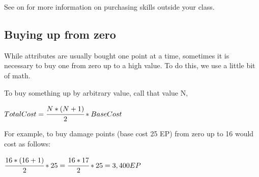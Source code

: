 See  on  for more information on purchasing skills outside your class.
\subsection{Buying up from zero}
While attributes are usually bought one point at a time, sometimes it is necessary to buy one from zero up to a high value. To do this, we use a little bit of math.

To buy something up by arbitrary value, call that value N,

\begin{normboxc}
\large
$Total Cost = \cfrac{N * (N+1)}{2} * Base Cost$
\end{normboxc}

For example, to buy damage points (base cost 25 EP) from zero up to 16 would cost as follows:

\begin{normboxc}
\large
$\cfrac{16 * (16+1)}{2} * 25 = \cfrac{16*17}{2} * 25 = 3,400 EP$
\end{normboxc}

